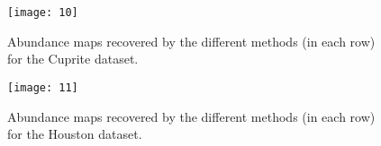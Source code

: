 \begin{figure*}
\centering
\texttt{[image: 10]}
\caption{Abundance maps recovered by the different methods (in each row) for the Cuprite dataset.}
\label{fig:A_cuprite}
\end{figure*}

\begin{figure}[t!]
\centering
\texttt{[image: 11]}
\caption{Abundance maps recovered by the different methods (in each row) for the Houston dataset.}
\label{fig:A_houston}
\end{figure}


%
